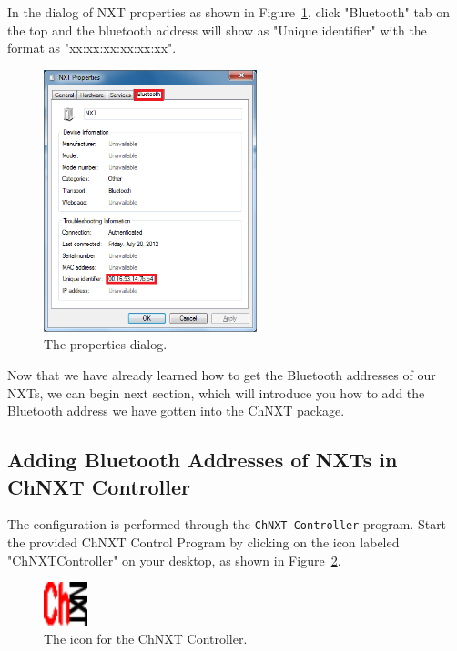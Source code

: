 \documentclass[11pt]{article}
\begin{document}
In the dialog of NXT properties as shown in Figure~\ref{fig:bt_property_dialog}, click "Bluetooth" tab on the
top and the bluetooth address will show as "Unique identifier" with the format as "xx:xx:xx:xx:xx:xx".

\begin{figure}[H]
  \begin{center}
    \includegraphics[height=3in]{figure/configuration/getBTaddress/btPropertiesDlg.png}
    \caption{The properties dialog.\label{fig:bt_property_dialog}}
  \end{center}
\end{figure}

Now that we have already learned how to get the Bluetooth addresses of our NXTs, we can begin next section, which
will introduce you how to add the Bluetooth address we have gotten into the ChNXT package.

\subsection{Adding Bluetooth Addresses of NXTs in ChNXT Controller}
The configuration is performed through the \texttt{ChNXT Controller} program. Start the 
provided ChNXT Control Program by clicking on the icon labeled "ChNXTController" on your desktop,
as shown in Figure~\ref{fig:chnxt_icon}.

\begin{figure}[H]
  \begin{center}
    \includegraphics[height=0.5in]{figure/configuration/chnxt.png}
    \caption{The icon for the ChNXT Controller.\label{fig:chnxt_icon}}
  \end{center}
\end{figure}
\end{document}
